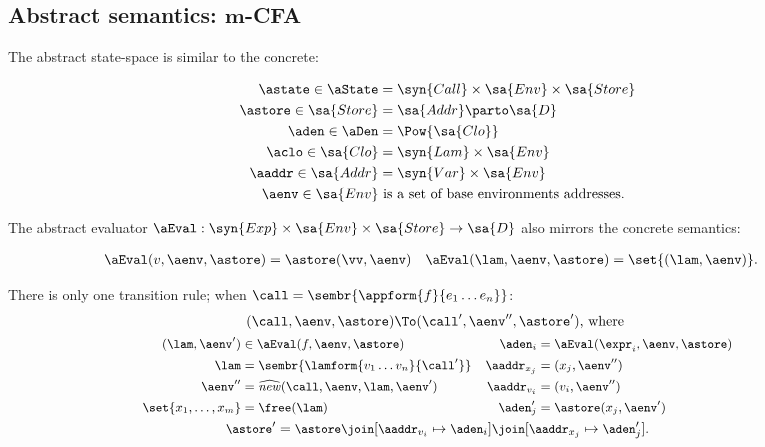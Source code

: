 \subsection{Abstract semantics: $\boldsymbol m$-CFA}
The abstract state-space is similar to the concrete:
\begin{small}\begin{align*}
  \astate \in \aState &=
  \syn{Call} \times 
  \sa{Env} \times
  \sa{Store}
  \\
  \astore \in \sa{Store} &= \sa{Addr} \parto \sa{D}
  \\
  \aden \in \aDen &= \Pow{\sa{Clo}}
  \\
  \aclo \in \sa{Clo} &= \syn{Lam} \times \sa{Env}
  \\
  \aaddr \in \sa{Addr} &= \syn{Var} \times \sa{Env}
  \\
  \aenv \in \sa{Env} &\text{ is a set of base environments addresses}
  \text.
\end{align*}\end{small}The abstract evaluator $\aEval : \syn{Exp} \times \sa{Env} \times \sa{Store} \to \sa{D}$ 
also mirrors the concrete semantics:
\begin{small}\begin{align*}
  \aEval(v,\aenv,\astore) &= \astore(\vv,\aenv)
  &
  \aEval(\lam,\aenv,\astore) &= \set{(\lam,\aenv)}
  \text.
\end{align*}\end{small}There is only one transition rule;
when $\call = \sembr{\appform{f}{e_1 \ldots e_n}}$:
\begin{gather*}
  (\call,\aenv,\astore)
  \To
  (\call',\aenv'',\astore')\text{, where }
  \\
\begin{small}\begin{align*}
  (\lam,\aenv') &\in \aEval(f,\aenv,\astore)
  &
  \aden_i &= \aEval(\expr_i,\aenv,\astore)
  \\
  \lam &= \sembr{\lamform{v_1 \ldots v_n}{\call'}}
  &
  \aaddr_{x_j} &= (x_j,\aenv'')
  \\
  \aenv'' &= \widehat{\mathit{new}}(\call,\aenv,\lam,\aenv')
  &
  \aaddr_{v_i} &= (v_i,\aenv'')
  \\
  \set{x_1,\ldots,x_m} &= \free(\lam)
  &
  \aden'_j &= \astore(x_j,\aenv')
  \end{align*}\end{small}\\  
\begin{small}
  \astore' = \astore
  \join
  [\aaddr_{v_i} \mapsto \aden_i]
  \join
  [\aaddr_{x_j} \mapsto \aden'_j]
  \text.
\end{small}\end{gather*}


